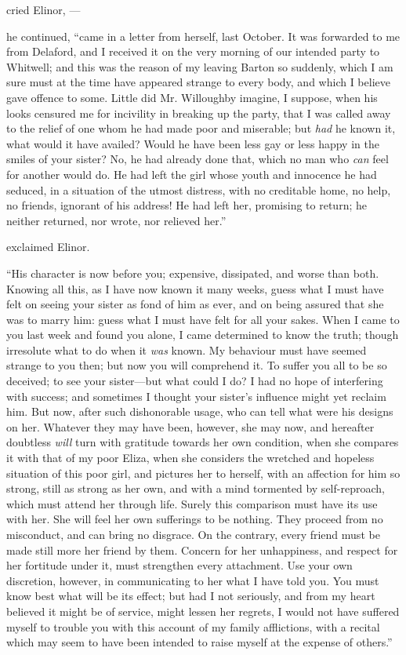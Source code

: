  cried Elinor, ---

 he continued, “came in a letter from herself, last October. It was forwarded to me from Delaford, and I received it on the very morning of our intended party to Whitwell; and this was the reason of my leaving Barton so suddenly, which I am sure must at the time have appeared strange to every body, and which I believe gave offence to some. Little did Mr. Willoughby imagine, I suppose, when his looks censured me for incivility in breaking up the party, that I was called away to the relief of one whom he had made poor and miserable; but {\em had} he known it, what would it have availed? Would he have been less gay or less happy in the smiles of your sister? No, he had already done that, which no man who {\em can} feel for another would do. He had left the girl whose youth and innocence he had seduced, in a situation of the utmost distress, with no creditable home, no help, no friends, ignorant of his address! He had left her, promising to return; he neither returned, nor wrote, nor relieved her.”

 exclaimed Elinor.

“His character is now before you; expensive, dissipated, and worse than both. Knowing all this, as I have now known it many weeks, guess what I must have felt on seeing your sister as fond of him as ever, and on being assured that she was to marry him: guess what I must have felt for all your sakes. When I came to you last week and found you alone, I came determined to know the truth; though irresolute what to do when it {\em was} known. My behaviour must have seemed strange to you then; but now you will comprehend it. To suffer you all to be so deceived; to see your sister---but what could I do? I had no hope of interfering with success; and sometimes I thought your sister's influence might yet reclaim him. But now, after such dishonorable usage, who can tell what were his designs on her. Whatever they may have been, however, she may now, and hereafter doubtless {\em will} turn with gratitude towards her own condition, when she compares it with that of my poor Eliza, when she considers the wretched and hopeless situation of this poor girl, and pictures her to herself, with an affection for him so strong, still as strong as her own, and with a mind tormented by self-reproach, which must attend her through life. Surely this comparison must have its use with her. She will feel her own sufferings to be nothing. They proceed from no misconduct, and can bring no disgrace. On the contrary, every friend must be made still more her friend by them. Concern for her unhappiness, and respect for her fortitude under it, must strengthen every attachment. Use your own discretion, however, in communicating to her what I have told you. You must know best what will be its effect; but had I not seriously, and from my heart believed it might be of service, might lessen her regrets, I would not have suffered myself to trouble you with this account of my family afflictions, with a recital which may seem to have been intended to raise myself at the expense of others.”

